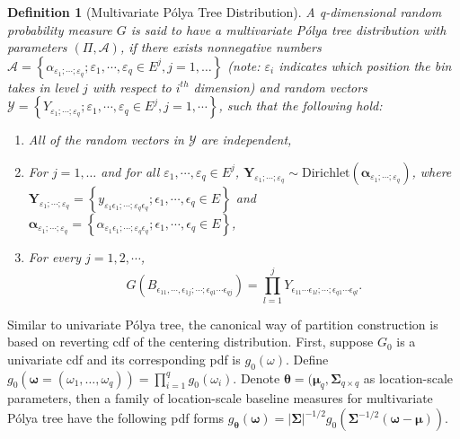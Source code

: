\documentclass{article}
\newtheorem{deff}[thm]{Definition}
\newcommand{\polya}{P\'{o}lya}
\begin{document}
\begin{deff}[Multivariate \polya{} Tree Distribution]
A q-dimensional random probability measure $G$ is said to have a
multivariate \polya{} tree distribution with parameters $(\Pi,
\mathcal{A})$, if there exists nonnegative numbers
$\mathcal{A}=\left\{ \alpha_{\varepsilon_1;\cdots;\varepsilon_q} ;
  \varepsilon_1, \cdots, \varepsilon_q \in E^j, j=1, \ldots \right\}$
(note: $\varepsilon_i$ indicates which position the bin takes in level
$j$ with respect to $i^{th}$ dimension) and random vectors
$\mathcal{Y} = \left\{ Y_{\varepsilon_1;\cdots;\varepsilon_q} ;
  \varepsilon_1, \cdots, \varepsilon_q \in E^j, j=1, \cdots \right\}$,
such that the following hold: 
\begin{enumerate}
\item All of the random vectors in $\mathcal{Y}$ are independent,
\item For $j=1, \ldots$ and for all $\varepsilon_1, \cdots,
  \varepsilon_q \in E^j$, $\bm{Y}_{\varepsilon_1;\cdots;\varepsilon_q}
  \sim \mathrm{Dirichlet}\left( \bm{\alpha}_{\varepsilon_1; \cdots;
      \varepsilon_q} \right)$, where
  $\bm{Y}_{\varepsilon_1;\cdots;\varepsilon_q} = \left\{
    y_{\varepsilon_1\epsilon_1; \cdots; \varepsilon_q\epsilon_q};
    \epsilon_1, \cdots, \epsilon_q \in E \right\}$ and $\bm{\alpha}_{\varepsilon_1; \cdots;
      \varepsilon_q} = \left\{ \alpha_{\varepsilon_1\epsilon_1;
        \cdots; \varepsilon_q\epsilon_q}; \epsilon_1, \cdots,
      \epsilon_q \in E \right\}$,
\item For every $j=1,2, \cdots$, 
\begin{displaymath}
G(B_{\epsilon_{11},\cdots,
  \epsilon_{1j};\cdots;\epsilon_{q1}\cdots\epsilon_{qj}}) =
\prod_{l=1}^j Y_{\epsilon_{11}\cdots \epsilon_{1l}; \cdots ; \epsilon_{q1}\cdots\epsilon_{ql}}.
\end{displaymath}
\end{enumerate}
\end{deff}

Similar to univariate \polya{} tree, the canonical way of partition
construction is based on reverting cdf of the centering
distribution. First, suppose $G_0$ is a univariate cdf and its
corresponding pdf is $g_0(\omega)$. Define $g_0(\bm{\omega}=(\omega_1,
\ldots, \omega_q)) = \prod_{i=1}^q g_0(\omega_i)$. Denote
$\bm{\theta}= (\bm{\mu}_q, \bm{\Sigma}_{q\times q}$ as location-scale
parameters, then a family of location-scale baseline measures for
multivariate \polya{} tree have the following pdf forms
$g_{\bm{\theta}} ( \bm{\omega}) = |\bm{\Sigma}|^{-1/2} g_0 (
\bm{\Sigma}^{-1/2} (\bm{\omega} - \bm{\mu}) ) $. 
\end{document}
